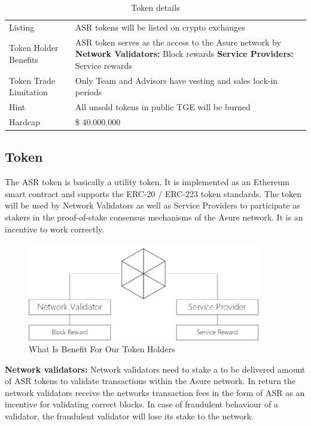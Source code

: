 \begin{table}[H]
\begin{tabular}{lp{}l}
  Listing & ASR tokens will be listed on crypto exchanges \\
  Token Holder Benefits & ASR token serves as the access to the Asure network by\newline
    \textbf{Network Validators:} Block rewards\newline
        \textbf{Service Providers:} Service rewards\\
  Token Trade Limitation & Only Team and Advisors have vesting and sales lock-in periods \\
  Hint & All unsold tokens in public TGE  will be burned \\\hline  
  
  Hardcap & \$ 40.000.000
  
\end{tabular}
\caption{\label{tab:table-name}Token details}
\end{table}







\subsection{Token}

The ASR token is basically a utility token. It is implemented as an Ethereum smart contract and supports the ERC-20 / ERC-223 token standards. The token will be used by Network Validators as well as Service Providers to participate as stakers in the proof-of-stake consensus mechanisms of the Asure network. It is an incentive to work correctly.

\begin{figure}[H]
    \centering
    \includegraphics[width=4.0in]{img/staking.png}
    \caption{What Is Benefit For Our Token Holders}
    \label{fig:asure_architecture}
\end{figure}

\textbf{Network validators:}
Network validators need to stake a to be delivered amount of ASR tokens to validate transactions within the Asure network. In return the network validators receive the networks transaction fees in the form of ASR as an incentive for validating correct blocks. In case of fraudulent behaviour of a validator, the fraudulent validator will lose its stake to the network.

